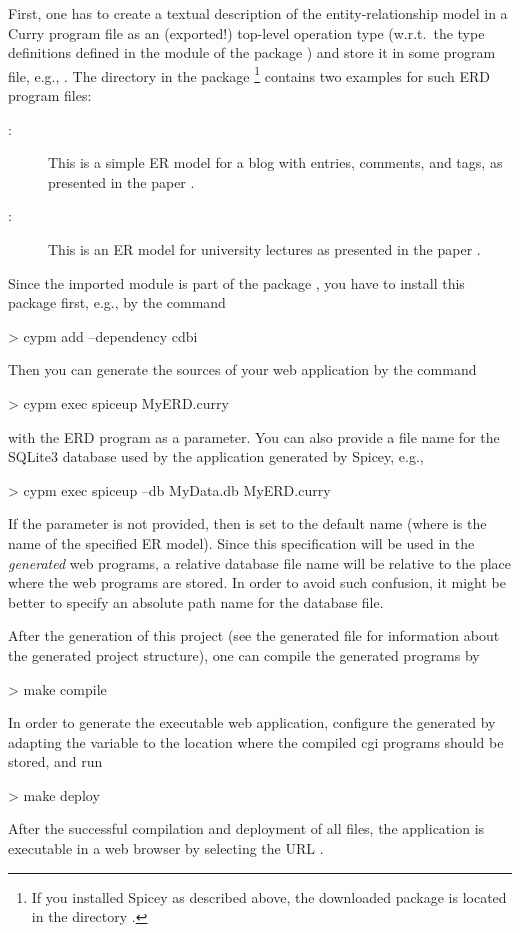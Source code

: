 First, one has to create a textual description of the
entity-relationship model
in a Curry program file as an (exported!) top-level operation type 
(w.r.t.\ the type definitions defined in the module 
of the package )
and store it in some program file, e.g., .
The directory  in the package \footnote{%
If you installed Spicey as described above,
the downloaded  package is located in the directory
.}
contains two examples for such ERD program files:
\begin{description}
\item[:]
This is a simple ER model for a blog with entries, comments,
and tags, as presented in the paper \cite{HanusKoschnicke14TPLP}.
\item[:]
This is an ER model for university lectures as
presented in the paper \cite{BrasselHanusMueller08PADL}.
\end{description}
%
Since the imported module  is part of the package
, you have to install this package first, e.g., by the command
\begin{curry}
> cypm add --dependency cdbi
\end{curry}
Then you can generate the sources of your web application
by the command
\begin{curry}
> cypm exec spiceup MyERD.curry
\end{curry}
with the ERD program as a parameter.
You can also provide a file name for the SQLite3 database used
by the application generated by Spicey, e.g.,
\begin{curry}
> cypm exec spiceup --db MyData.db MyERD.curry
\end{curry}
If the parameter  is not provided,
then  is set to the default name 
(where  is the name of the specified ER model).
Since this specification will be used in the \emph{generated} web programs,
a relative database file name will be relative to the place where
the web programs are stored.
In order to avoid such confusion, it might be better to specify
an absolute path name for the database file.

After the generation of this project (see the generated file
 for information about the generated project structure),
one can compile the generated programs by
\begin{curry}
> make compile
\end{curry}
In order to generate the executable web application,
configure the generated 
by adapting the variable  to the location
where the compiled cgi programs should be stored, and run
\begin{curry}
> make deploy
\end{curry}
After the successful compilation and deployment of all files,
the application is executable
in a web browser by selecting the URL .
